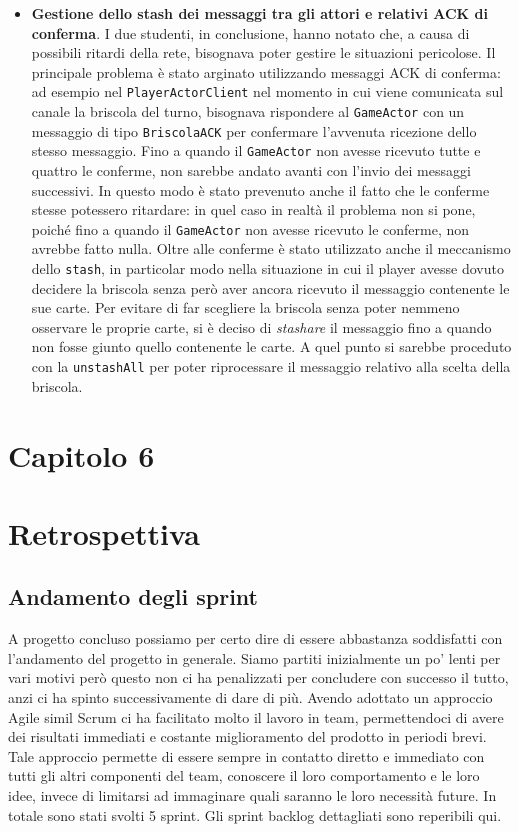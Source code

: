 \begin {itemize}
        \item \textbf{Gestione dello stash dei messaggi tra gli attori e relativi ACK di conferma}. I due studenti, in conclusione, hanno notato che, a causa di possibili ritardi della rete, bisognava poter gestire le situazioni pericolose. Il principale problema è stato arginato utilizzando messaggi ACK di conferma: ad esempio nel \texttt{PlayerActorClient} nel momento in cui viene comunicata sul canale la briscola del turno, bisognava rispondere al \texttt{GameActor} con un messaggio di tipo \texttt{BriscolaACK} per confermare l'avvenuta ricezione dello stesso messaggio. Fino a quando il \texttt{GameActor} non avesse ricevuto tutte e quattro le conferme, non sarebbe andato avanti con l'invio dei messaggi successivi. In questo modo è stato prevenuto anche il fatto che le conferme stesse potessero ritardare: in quel caso in realtà il problema non si pone, poiché fino a quando il \texttt{GameActor} non avesse ricevuto le conferme, non avrebbe fatto nulla. Oltre alle conferme è stato utilizzato anche il meccanismo dello \texttt{stash}, in particolar modo nella situazione in cui il player avesse dovuto decidere la briscola senza però aver ancora ricevuto il messaggio contenente le sue carte. Per evitare di far scegliere la briscola senza poter nemmeno osservare le proprie carte, si è deciso di \textit{stashare} il messaggio fino a quando non fosse giunto quello contenente le carte. A quel punto si sarebbe proceduto con la \texttt{unstashAll} per poter riprocessare il messaggio relativo alla scelta della briscola.
   	\end {itemize}

        \clearpage

 \section*{\Huge {\textbf Capitolo 6}\label{chapter6}}
    \section{Retrospettiva}\label{sec:retrospective}
\subsection{Andamento degli sprint}
A progetto concluso possiamo per certo dire di essere abbastanza soddisfatti con l’andamento del progetto in generale. Siamo partiti inizialmente un po’ lenti per vari motivi però questo non ci ha penalizzati per concludere con successo il tutto, anzi ci ha spinto successivamente di dare di più.
Avendo adottato un approccio Agile simil Scrum  ci ha facilitato molto il lavoro in team, permettendoci di avere dei risultati immediati e costante miglioramento del prodotto in periodi brevi. Tale approccio permette di essere sempre in contatto diretto e immediato con tutti gli altri componenti del team, conoscere il loro comportamento e le loro idee, invece di limitarsi ad immaginare quali saranno le loro necessità future. In totale sono stati svolti 5 sprint. Gli sprint backlog dettagliati sono reperibili qui.


